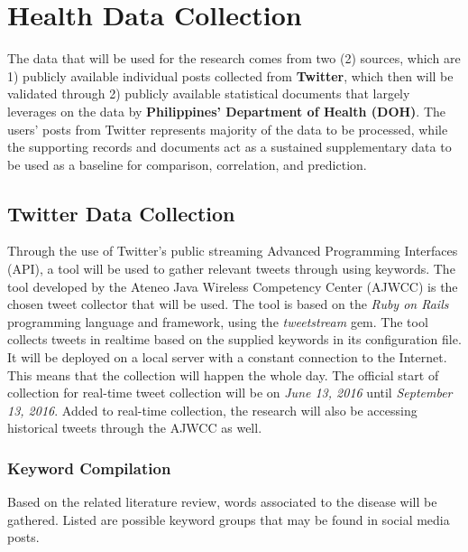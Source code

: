 \section{Health Data Collection}
The data that will be used for the research comes from two (2) sources, which are 1) publicly available individual posts collected from \textbf{Twitter}, which then will be validated through 2) publicly available statistical documents that largely leverages on the data by \textbf{Philippines' Department of Health (DOH)}. The users' posts from Twitter represents majority of the data to be processed, while the supporting records and documents act as a sustained supplementary data to be used as a baseline for comparison, correlation, and prediction.

\subsection{Twitter Data Collection}
Through the use of Twitter's public streaming Advanced Programming Interfaces (API), a tool will be used to gather relevant tweets through using keywords. The tool developed by the Ateneo Java Wireless Competency Center (AJWCC) is the chosen tweet collector that will be used. The tool is based on the \textit{Ruby on Rails} programming language and framework, using the \textit{tweetstream} gem. The tool collects tweets in realtime based on the supplied keywords in its configuration file. It will be deployed on a local server with a constant connection to the Internet. This means that the collection will happen the whole day. The official start of collection for real-time tweet collection will be on \textit{June 13, 2016} until \textit{September 13, 2016}. Added to real-time collection, the research will also be accessing historical tweets through the AJWCC as well.

\subsubsection {Keyword Compilation}
Based on the related literature review, words associated to the disease will be gathered. Listed are possible keyword groups that may be found in social media posts.

